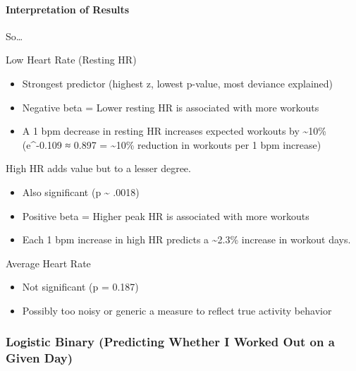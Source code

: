 \documentclass[
  11pt,
]{article}
\providecommand{\tightlist}{%
  \setlength{\itemsep}{0pt}\setlength{\parskip}{0pt}}
\begin{document}
\paragraph{Interpretation of Results}\label{interpretation-of-results}

So\ldots{}

Low Heart Rate (Resting HR)

\begin{itemize}
\tightlist
\item
  Strongest predictor (highest z, lowest p-value, most deviance
  explained)
\item
  Negative beta = Lower resting HR is associated with more workouts
\item
  A 1 bpm decrease in resting HR increases expected workouts by
  \textasciitilde10\% (e\^{}-0.109 ≈ 0.897 = \textasciitilde10\%
  reduction in workouts per 1 bpm increase)
\end{itemize}

High HR adds value but to a lesser degree.

\begin{itemize}
\tightlist
\item
  Also significant (p \textasciitilde{} .0018)
\item
  Positive beta = Higher peak HR is associated with more workouts
\item
  Each 1 bpm increase in high HR predicts a \textasciitilde2.3\%
  increase in workout days.
\end{itemize}

Average Heart Rate

\begin{itemize}
\tightlist
\item
  Not significant (p = 0.187)
\item
  Possibly too noisy or generic a measure to reflect true activity
  behavior
\end{itemize}

\subsubsection{Logistic Binary (Predicting Whether I Worked Out on a
Given
Day)}\label{logistic-binary-predicting-whether-i-worked-out-on-a-given-day}
\end{document}
